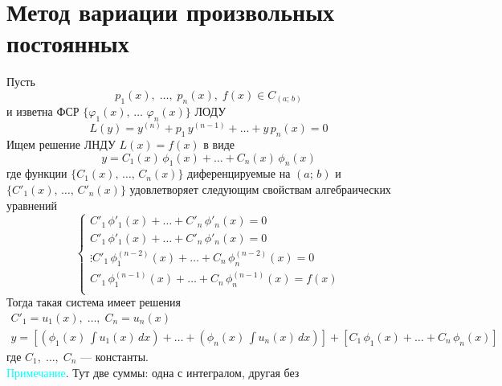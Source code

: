 \author{Tkachuk Andrei}

\section{Метод вариации произвольных постоянных}

\begin{Th}
    Пусть 
    \[
        p_1(x),\; \dots,\; p_n(x),\; f(x) \in C_{(a;\,b)}
    \]
    и изветна ФСР $\{\varphi_1(x),\, \dots\,\, \varphi_n(x)\}$ ЛОДУ
    \[
        L(y) = y^{(n)} + p_1\,y^{(n-1)} + \dots + y\,p_n(x) = 0
    \]
    Ищем решение ЛНДУ $L(x) = f(x)$ в виде 
    \[
        y = C_1(x)\,\phi_1(x) + \dots + C_n(x)\,\phi_n(x)
    \]
    где функции $\{C_1(x),\, \dots,\, C_n(x)\}$ диференцируемые на $(a;\, b)$
    и $\{C'_1(x),\, \dots,\, C'_n(x)\}$ удовлетворяет следующим свойствам алгебраических уравнений
    \[
        \begin{cases}
            C'_1\,\phi'_1(x) + \dots + C'_n\,\phi'_n(x) = 0\\
            C'_1\,\phi'_1(x) + \dots + C'_n\,\phi'_n(x) = 0\\
            \vdots
            C'_1\,\phi^{(n-2)}_1(x) + \dots + C_n\,\phi^{(n-2)}_n(x) = 0\\
            C'_1\,\phi^{(n-1)}_1(x) + \dots + C_n\,\phi^{(n-1)}_n(x) = f(x)\\
        \end{cases}
    \]
    Тогда такая система имеет решения
    \begin{gather*}
        C'_1 = u_1(x),\; \dots,\; C_n = u_n(x)\\
        y = \left[\left(\phi_1(x)\, \int u_1(x)\,dx \right) + \dots + \left( \phi_n(x)\, \int u_n(x)\,dx \right) \right] + \left[C_1\,\phi_1(x) + \dots + C_n\,\phi_n(x)\right]
    \end{gather*}
    где $C_1,\; \dots,\; C_n$ --- константы.\\
    \textcolor{cyan}{Примечание}. Тут две суммы: одна с интегралом, другая без
\end{Th}

